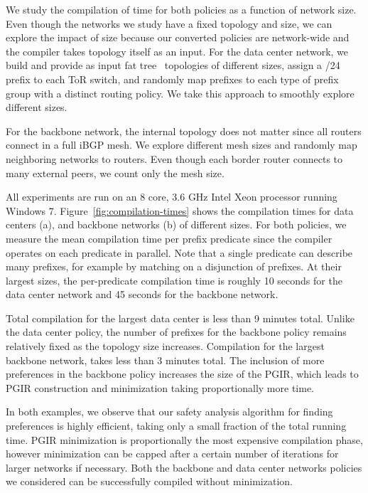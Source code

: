 \documentclass[10pt]{sigalternate052015}
\begin{document}
We study the compilation of time for both policies as a function of network size. Even though the networks we study have a fixed topology and size, we can explore the impact of size because our converted policies are network-wide and the compiler takes topology itself as an input. For the data center network, we build and provide as input fat tree~\cite{fattree} topologies of different sizes, assign a /24 prefix to each ToR switch, and randomly map prefixes to each type of prefix group with a distinct routing policy. We take this approach to smoothly explore different sizes. 

For the backbone network, the internal topology does not matter since all routers connect in a full iBGP mesh. We explore different mesh sizes and randomly map neighboring networks to routers. Even though each border router connects to many external peers, we count only the mesh size.

All experiments are run on an 8 core, 3.6 GHz Intel Xeon processor running Windows 7.
%
Figure~\ref{fig:compilation-times} shows the compilation times for data centers (a), and backbone networks (b) of different sizes. For both policies, we measure the mean compilation time per prefix predicate since the compiler operates on each predicate in parallel. Note that a single predicate can describe many prefixes, for example by matching on a disjunction of prefixes. At their largest sizes, the per-predicate compilation time is roughly 10 seconds for the data center network and 45 seconds for the backbone network.


Total compilation for the largest data center is less than 9 minutes total. Unlike the data center policy, the number of prefixes for the backbone policy remains relatively fixed as the topology size increases. Compilation for the largest backbone network, takes less than 3 minutes total. The inclusion of more preferences in the backbone policy increases the size of the PGIR, which leads to PGIR construction and minimization taking proportionally more time.

In both examples, we observe that our safety analysis algorithm for finding preferences is highly efficient, taking only a small fraction of the total running time. PGIR minimization is proportionally the most expensive compilation phase, however minimization can be capped after a certain number of iterations for larger networks if necessary. Both the backbone and data center networks policies we considered can be successfully compiled without minimization.
\end{document}
